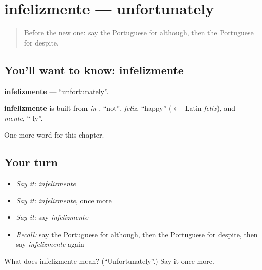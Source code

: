 \section[infelizmente]{infelizmente — unfortunately}

\label{lesson:PT-C152-infelizmente}



\begin{quote}
Before the new one: say the Portuguese for although, then the Portuguese for despite.
\end{quote}

\subsection*{You'll want to know: infelizmente}
\textbf{infelizmente} — \textquotedblleft{}unfortunately\textquotedblright{}.

\begin{cousinweb}
\textbf{infelizmente} is built from \emph{in-}, \textquotedblleft{}not\textquotedblright{}, \emph{feliz}, \textquotedblleft{}happy\textquotedblright{} ($\leftarrow$ Latin \emph{felix}), and \emph{-mente}, \textquotedblleft{}-ly\textquotedblright{}.
\end{cousinweb}

\begin{grammarlens}[title={What you've built}]
One more word for this chapter.
\end{grammarlens}

\subsection*{Your turn}
\begin{itemize}
\raggedright
  \item \emph{Say it:} \emph{infelizmente}
  \item \emph{Say it:} \emph{infelizmente}, once more
  \item \emph{Say it:} say \emph{infelizmente}
  \item \emph{Recall:} say the Portuguese for although, then the Portuguese for despite, then say \emph{infelizmente} again
\end{itemize}

\begin{tcolorbox}[breakable,colback=teal!4,colframe=teal!35!black,title={Before you move on}]
What does infelizmente mean? (\textquotedblleft{}Unfortunately\textquotedblright{}.) Say it once more.
\end{tcolorbox}
